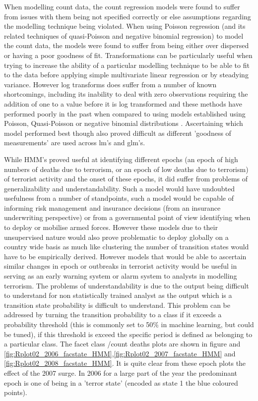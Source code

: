 When modelling count data, the count regression models were found to suffer from issues with them being not specified correctly or else assumptions regarding the modelling technique being violated.  When using Poisson regression (and its related techniques of quasi-Poisson and negative binomial regression) to model the count data, the models were found to suffer from being either over dispersed or having a poor goodness of fit. Transformations can be particularly useful when trying to increase the ability of a particular modelling technique to be able to fit to the data 
before applying simple multivariate linear regression or by steadying variance. However log transforms does suffer from a number of known shortcomings, including its inability to deal with zero observations requiring the addition of one to a value before it is log transformed and these methods have performed poorly in the past when compared to using models established using Poisson, Quasi-Poisson or negative binomial distributions \citep{o2010not}. Ascertaining which model performed best though also proved difficult as different 'goodness of measurements' are used across lm's and glm's. 

While HMM's proved useful at identifying different epochs (an epoch of high numbers of deaths due to terrorism, or an epoch of low deaths due to terrorism) of terrorist activity and the onset of these epochs, it did suffer from problems of generalizability and understandability. Such a model would have undoubted usefulness from a number of standpoints, such a model would be capable of informing risk management and insurance decisions (from an insurance underwriting perspective) or from a governmental point of view identifying when to deploy or mobilise armed forces. However these models due to their unsupervised nature would also prove problematic to deploy globally on a country wide basis as much like clustering the number of transition states would have to be empirically derived. However models that would be able to ascertain similar changes in epoch or outbreaks in terrorist activity would be useful in serving as an early warning system or alarm system to analysts in modelling terrorism. The problems of understandability is due to the output being difficult to understand for non statistically trained analyst as the output which is a transition state probability is difficult to understand. This problem can be addressed by turning the transition probability to a class if it exceeds a probability threshold (this is commonly set to 50\% in machine learning, but could be tuned), if this threshold is exceed the specific period is defined as belonging to a particular class. The facet class /count deaths plots are shown in figure and \ref{fig:Rplot02_2006_facstate_HMM},\ref{fig:Rplot02_2007_facstate_HMM} and \ref{fig:Rplot02_2008_facstate_HMM}. It is quite clear from these epoch plots the effect of the 2007 surge. In 2006  for a large part of the year the predominant epoch is one of being in a 'terror state' (encoded as state 1 the blue coloured points). 


